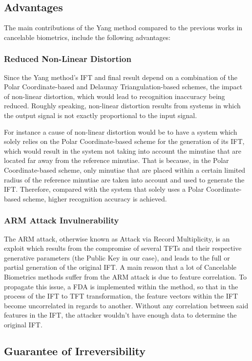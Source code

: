 \documentclass[fyp]{socreport}
\begin{document}
\subsection{Advantages}
The main contributions of the Yang method compared to the previous works in cancelable biometrics, include the following advantages:

\subsubsection{Reduced Non-Linear Distortion}
Since the Yang method's IFT and final result depend on a combination of the Polar Coordinate-based and Delaunay Triangulation-based schemes, the impact of non-linear distortion, which would lead to recognition inaccuracy being reduced. Roughly speaking, non-linear distortion results from systems in which the output signal is not exactly proportional to the input signal. 

For instance a cause of non-linear distortion would be to have a system which solely relies on the Polar Coordinate-based scheme for the generation of its IFT, which would result in the system not taking into account the minutiae that are located far away from the reference minutiae. That is because, in the Polar Coordinate-based scheme, only minutiae that are placed within a certain limited radius of the reference minutiae are taken into account and used to generate the IFT. Therefore, compared with the system that solely uses a Polar Coordinate-based scheme, higher recognition accuracy is achieved.

\subsubsection{ARM Attack Invulnerability}
The ARM attack, otherwise known as Attack via Record Multiplicity, is an exploit which results from the compromise of several TFTs and their respective generative parameters (the Public Key in our case), and leads to the full or partial generation of the original IFT. A main reason that a lot of Cancelable Biometrics methods suffer from the ARM attack is due to feature correlation. To propagate this issue, a FDA is implemented within the method, so that in the process of the IFT to TFT transformation, the feature vectors within the IFT become uncorrelated in regards to another. Without any correlation between said features in the IFT, the attacker wouldn't have enough data to determine the original IFT.

\subsection{Guarantee of Irreversibility}
\end{document}
